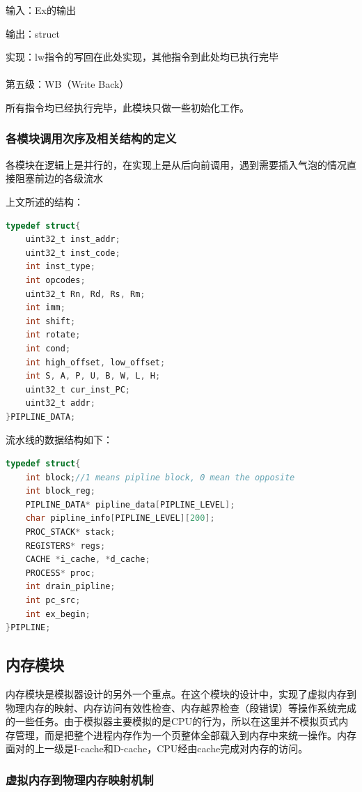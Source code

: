 \documentclass[12pt,a4paper]{article}
\begin{document}
输入：Ex的输出

输出：struct

实现：lw指令的写回在此处实现，其他指令到此处均已执行完毕\\\\
第五级：WB（Write Back）

所有指令均已经执行完毕，此模块只做一些初始化工作。

\subsubsection{各模块调用次序及相关结构的定义}
各模块在逻辑上是并行的，在实现上是从后向前调用，遇到需要插入气泡的情况直接阻塞前边的各级流水

上文所述的结构：
	
\begin{lstlisting}[language={C}]
typedef struct{
    uint32_t inst_addr;
    uint32_t inst_code;
    int inst_type;
    int opcodes;
    uint32_t Rn, Rd, Rs, Rm;
    int imm;
    int shift;
    int rotate;
    int cond;
    int high_offset, low_offset;
    int S, A, P, U, B, W, L, H;
    uint32_t cur_inst_PC;
    uint32_t addr;
}PIPLINE_DATA;
\end{lstlisting}

流水线的数据结构如下：

\begin{lstlisting}[language={C}]
typedef struct{
    int block;//1 means pipline block, 0 mean the opposite
    int block_reg;
    PIPLINE_DATA* pipline_data[PIPLINE_LEVEL];
    char pipline_info[PIPLINE_LEVEL][200];
    PROC_STACK* stack;
    REGISTERS* regs;
    CACHE *i_cache, *d_cache;
    PROCESS* proc;
    int drain_pipline;
    int pc_src;
    int ex_begin;
}PIPLINE;
\end{lstlisting}

\subsection{内存模块}

内存模块是模拟器设计的另外一个重点。在这个模块的设计中，实现了虚拟内存到物理内存的映射、内存访问有效性检查、内存越界检查（段错误）等操作系统完成的一些任务。由于模拟器主要模拟的是CPU的行为，所以在这里并不模拟页式内存管理，而是把整个进程内存作为一个页整体全部载入到内存中来统一操作。内存面对的上一级是I-cache和D-cache，CPU经由cache完成对内存的访问。

\subsubsection{虚拟内存到物理内存映射机制}
\end{document}
